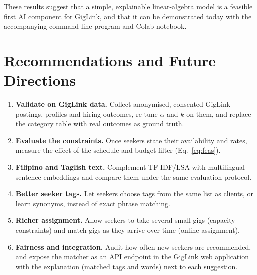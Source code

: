 \documentclass[12pt,a4paper]{article}
\numberwithin{equation}{section}
\theoremstyle{definition}
\theoremstyle{plain}
\begin{document}
These results suggest that a simple, explainable linear-algebra model is a feasible first AI component for GigLink, and that it can be demonstrated today with the accompanying command-line program and Colab notebook.

\section{Recommendations and Future Directions}\label{sec:future}
\begin{enumerate}[label=\arabic*.]
  \item \textbf{Validate on GigLink data.} Collect anonymised, consented GigLink postings, profiles and hiring outcomes, re-tune $\alpha$ and $k$ on them, and replace the category table with real outcomes as ground truth.
  \item \textbf{Evaluate the constraints.} Once seekers state their availability and rates, measure the effect of the schedule and budget filter (Eq.~\ref{eq:feas}).
  \item \textbf{Filipino and Taglish text.} Complement TF-IDF/LSA with multilingual sentence embeddings and compare them under the same evaluation protocol.
  \item \textbf{Better seeker tags.} Let seekers choose tags from the same list as clients, or learn synonyms, instead of exact phrase matching.
  \item \textbf{Richer assignment.} Allow seekers to take several small gigs (capacity constraints) and match gigs as they arrive over time (online assignment).
  \item \textbf{Fairness and integration.} Audit how often new seekers are recommended, and expose the matcher as an API endpoint in the GigLink web application with the explanation (matched tags and words) next to each suggestion.
\end{enumerate}


\newpage
\end{document}
